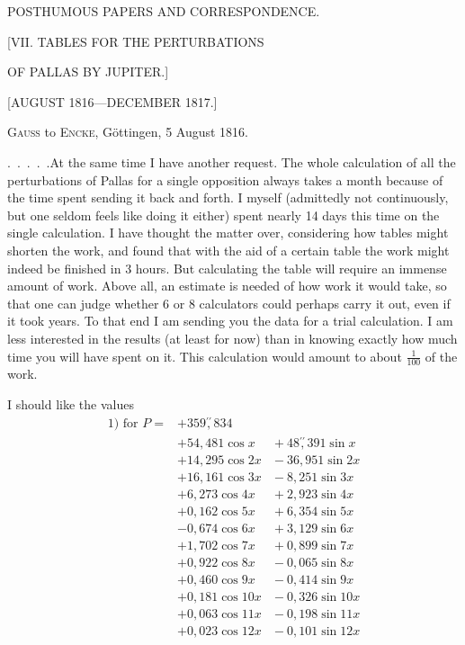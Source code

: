 \begingroup
{}
\clearpage
{}
\begin{center}
\large POSTHUMOUS PAPERS AND CORRESPONDENCE.
\par\bigskip
\Large [VII. TABLES FOR THE PERTURBATIONS\par OF PALLAS BY JUPITER.]
\par\medskip
\normalsize [AUGUST 1816---DECEMBER 1817.]
\par\bigskip
[1.]
\par\medskip
\textsc{Gauss} to \textsc{Encke}, Göttingen, 5 August 1816.
\end{center}
\par\noindent\hspace*{\parindent}.\ .\ .\ .\ .\quad At the same time I have another request. The whole calculation
of all the perturbations of Pallas for a single opposition always takes
a month because of the time spent sending it back and forth. I myself
(admittedly not continuously, but one seldom feels like doing it either)
spent nearly 14 days this time on the single calculation. I have thought
the matter over, considering how tables might shorten the work, and found
that with the aid of a certain table the work might indeed be finished in 3 hours.
But calculating the table will require an immense amount of work.
Above all, an estimate is needed of how
 work it would take, so that one can judge whether 6 or 8 calculators
could perhaps carry it out, even if it took years. To that end
I am sending you the data for a trial calculation. I am less interested
in the results (at least for now) than in knowing exactly how
much time you will have spent on it. This calculation would amount to
about \(\tfrac{1}{100}\) of the  work.
\par\noindent\hspace*{\parindent}I should like the values
\[
\begin{aligned}
\text{1) for }P={}&+359\overset{\prime\prime}{,}834\\
&+54{,}481\cos x &{}+48\overset{\prime\prime}{,}391\sin x\\
&+14{,}295\cos2x &{}-36{,}951\sin2x\\
&+16{,}161\cos3x &{}-8{,}251\sin3x\\
&+6{,}273\cos4x &{}+2{,}923\sin4x\\
&+0{,}162\cos5x &{}+6{,}354\sin5x\\
&-0{,}674\cos6x &{}+3{,}129\sin6x\\
&+1{,}702\cos7x &{}+0{,}899\sin7x\\
&+0{,}922\cos8x &{}-0{,}065\sin8x\\
&+0{,}460\cos9x &{}-0{,}414\sin9x\\
&+0{,}181\cos10x &{}-0{,}326\sin10x\\
&+0{,}063\cos11x &{}-0{,}198\sin11x\\
&+0{,}023\cos12x &{}-0{,}101\sin12x
\end{aligned}
\]
